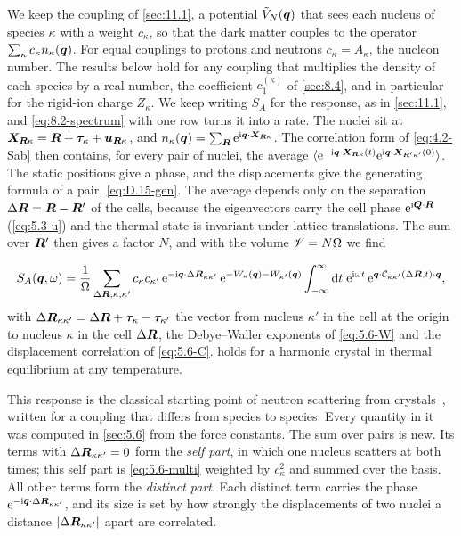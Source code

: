 We keep the coupling of \cref{sec:11.1}, a potential $\tilde V_N(\bm{q})$ that sees each nucleus of species $\kappa$ with a weight $c_\kappa$, so that the dark matter couples to the operator $\sum_\kappa c_\kappa n_\kappa(\bm{q})$. For equal couplings to protons and neutrons $c_\kappa = A_\kappa$, the nucleon number. The results below hold for any coupling that multiplies the density of each species by a real number, the coefficient $c_1^{(\kappa)}$ of \cref{sec:8.4}, and in particular for the rigid-ion charge $Z_\kappa$. We keep writing $S_A$ for the response, as in \cref{sec:11.1}, and \cref{eq:8.2-spectrum} with one row turns it into a rate. The nuclei sit at $\bm{X}_{\bm{R}\kappa} = \bm{R} + \bm{\tau}_\kappa + \bm{u}_{\bm{R}\kappa}$, and $n_\kappa(\bm{q}) = \sum_{\bm{R}}\mathrm{e}^{\mathrm{i}\bm{q}\cdot\bm{X}_{\bm{R}\kappa}}$. The correlation form of \cref{eq:4.2-Sab} then contains, for every pair of nuclei, the average $\langle\mathrm{e}^{-\mathrm{i}\bm{q}\cdot\bm{X}_{\bm{R}\kappa}(t)}\mathrm{e}^{\mathrm{i}\bm{q}\cdot\bm{X}_{\bm{R}'\kappa'}(0)}\rangle$. The static positions give a phase, and the displacements give the generating formula of a pair, \cref{eq:D.15-gen}. The average depends only on the separation $\Delta\bm{R} = \bm{R} - \bm{R}'$ of the cells, because the eigenvectors carry the cell phase $\mathrm{e}^{\mathrm{i}\bm{Q}\cdot\bm{R}}$ (\cref{eq:5.3-u}) and the thermal state is invariant under lattice translations. The sum over $\bm{R}'$ then gives a factor $N$, and with the volume $\mathscr{V} = N\Omega$ we find
\begin{keyresult}
\begin{equation}
  S_A(\bm{q},\omega) = \frac1\Omega\sum_{\Delta\bm{R},\kappa,\kappa'}c_\kappa c_{\kappa'}\,\mathrm{e}^{-\mathrm{i}\bm{q}\cdot\Delta\bm{R}_{\kappa\kappa'}}\,\mathrm{e}^{-W_\kappa(\bm{q}) - W_{\kappa'}(\bm{q})}\int_{-\infty}^{\infty}\mathrm{d} t\;\mathrm{e}^{\mathrm{i}\omega t}\,\mathrm{e}^{\bm{q}\cdot\mathcal{C}_{\kappa\kappa'}(\Delta\bm{R},t)\cdot\bm{q}} ,
  \label{eq:11.3-exact}
\end{equation}
with $\Delta\bm{R}_{\kappa\kappa'} = \Delta\bm{R} + \bm{\tau}_\kappa - \bm{\tau}_{\kappa'}$ the vector from nucleus $\kappa'$ in the cell at the origin to nucleus $\kappa$ in the cell $\Delta\bm{R}$, the Debye--Waller exponents of \cref{eq:5.6-W} and the displacement correlation of \cref{eq:5.6-C}.  holds for a harmonic crystal in thermal equilibrium at any temperature.
\end{keyresult}
\noindent This response is the classical starting point of neutron scattering from crystals~\cite[App.~N]{ashcroft1976solid}, written for a coupling that differs from species to species. Every quantity in it was computed in \cref{sec:5.6} from the force constants. The sum over pairs is new. Its terms with $\Delta\bm{R}_{\kappa\kappa'} = 0$ form the \emph{self part}, in which one nucleus scatters at both times; this self part is \cref{eq:5.6-multi} weighted by $c_\kappa^2$ and summed over the basis. All other terms form the \emph{distinct part}. Each distinct term carries the phase $\mathrm{e}^{-\mathrm{i}\bm{q}\cdot\Delta\bm{R}_{\kappa\kappa'}}$, and its size is set by how strongly the displacements of two nuclei a distance $|\Delta\bm{R}_{\kappa\kappa'}|$ apart are correlated.

